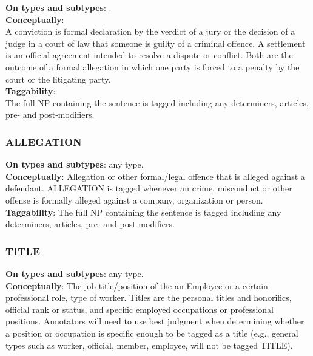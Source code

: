 \justify
\noindent\textbf{On types and subtypes}: .\\[6pt]
\noindent\textbf{Conceptually}:\\
A conviction is formal declaration by the verdict of a jury or the decision of a judge in a court of law that someone is guilty of a criminal offence.
A settlement is an official agreement intended to resolve a dispute or conflict.
Both are the outcome of a formal allegation in which one party is forced to a penalty by the court or the litigating party.
\\[6pt]
\noindent\textbf{Taggability}:\\
The full NP containing the sentence is tagged including any determiners, articles, pre- and post-modifiers.

\vspace{0.5cm}

\hypertarget{ALLEGATION}{
\subsubsection{ALLEGATION}}

\justify
\noindent\textbf{On types and subtypes}: any  type.\\[6pt]
\noindent\textbf{Conceptually}:
Allegation or other formal/legal offence that is alleged against a defendant.
ALLEGATION is tagged whenever an crime, misconduct or other offense is formally alleged against a company, organization or person.
\\[6pt]
\noindent\textbf{Taggability}:
The full NP containing the sentence is tagged including any determiners, articles, pre- and post-modifiers.

\vspace{0.5cm}

\hypertarget{TITLE}{
\subsubsection{TITLE}}

\justify
\noindent\textbf{On types and subtypes}: any  type.\\[6pt]
\noindent\textbf{Conceptually}:
The job title/position of the an Employee or a certain professional role, type of worker.
Titles are the personal titles and honorifics, official rank or status, and specific employed occupations or professional positions. Annotators will need to use best judgment when determining whether a position or occupation is specific enough to be tagged as a title (e.g., general types such as worker, official, member, employee, will not be tagged TITLE).\\[6pt]

